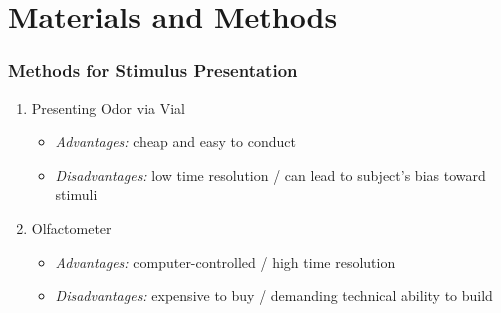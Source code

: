 \documentclass{beamer}
\begin{document}
\section{Materials and Methods} 

\begin{frame}
	\frametitle{Methods for Stimulus Presentation}
	\begin{enumerate}
		\item
		Presenting Odor via Vial
		\begin{itemize}
			\item
			\textit{Advantages:} cheap and easy to conduct
			\item
			\textit{Disadvantages:} low time resolution / can lead to subject's bias toward stimuli		
		\end{itemize}
		\vspace{0.5cm}
		\item
		Olfactometer
		\begin{itemize}
			\item
			\textit{Advantages:} computer-controlled / high time resolution
			\item
			\textit{Disadvantages:} expensive to buy / demanding technical ability to build
		\end{itemize}

	\end{enumerate}
\end{frame}
\end{document}
